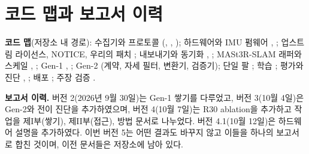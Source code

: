 \documentclass[conference,10pt]{IEEEtran}
\begin{document}
\appendices
\section{코드 맵과 보고서 이력}\label{app:code}
\textbf{코드 맵}(저장소 내 경로): 수집기와 프로토콜  (, ,
); 하드웨어와 IMU 펌웨어 , ; 업스트림 라이선스, NOTICE, 우리의 패치
; 내보내기와 동기화 , ; MASt3R-SLAM 래퍼와 스케일
, ; Gen-1 , ;
Gen-2 (계약, 자세 필터, 변환기, 검증기); 단일 팔 ; 학습 ; 평가와 진단 ,
; 배포 ; 주장 검증 .

\textbf{보고서 이력.} 버전 2(2026년 9월 30일)는 Gen-1 쌓기를 다루었고, 버전 3(10월 4일)은 Gen-2와 전이 진단을 추가하였으며, 버전
4(10월 7일)는 R30 ablation을 추가하고 작업을 제I부(쌓기), 제II부(접근), 방법 문서로 나누었다. 버전 4.1(10월 12일)은 하드웨어 설명을
추가하였다. 이번 버전 5는 어떤 결과도 바꾸지 않고 이들을 하나의 보고서로 합친 것이며, 이전 문서들은 저장소에 남아 있다.
\end{document}
